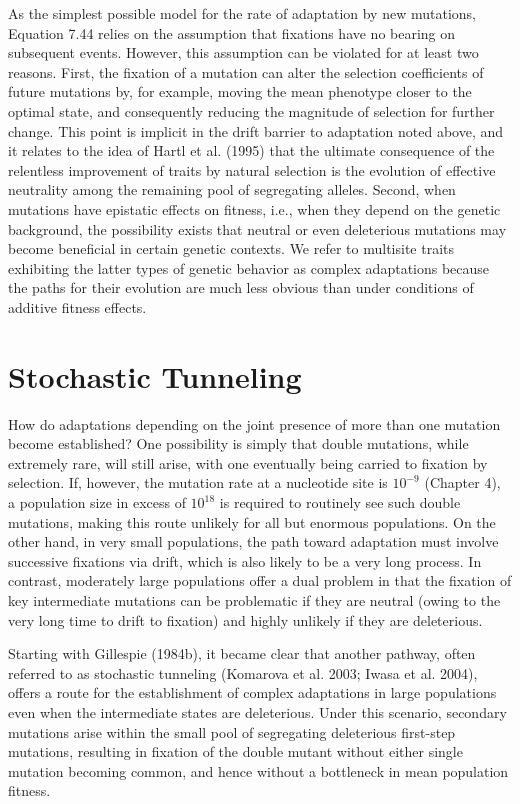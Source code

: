 \documentclass{article}
\begin{document}
As the simplest possible model for the rate of adaptation by new mutations, Equation 7.44 relies on the assumption that fixations have no bearing on subsequent events. However, this assumption can be violated for at least two reasons. First, the fixation of a mutation can alter the selection coefficients of future mutations by, for example, moving the mean phenotype closer to the optimal state, and consequently reducing the magnitude of selection for further change. This point is implicit in the drift barrier to adaptation noted above, and it relates to the idea of Hartl et al. (1995) that the ultimate consequence of the relentless improvement of traits by natural selection is the evolution of effective neutrality among the remaining pool of segregating alleles. Second, when mutations have epistatic effects on fitness, i.e., when they depend on the genetic background, the possibility exists that neutral or even deleterious mutations may become beneficial in certain genetic contexts. We refer to multisite traits exhibiting the latter types of genetic behavior as complex adaptations because the paths for their evolution are much less obvious than under conditions of additive fitness effects.

\section{Stochastic Tunneling}
How do adaptations depending on the joint presence of more than one mutation become established? One possibility is simply that double mutations, while extremely rare, will still arise, with one eventually being carried to fixation by selection. If, however, the mutation rate at a nucleotide site is  $ 10^{-9} $ (Chapter 4), a population size in excess of  $ 10^{18} $ is required to routinely see such double mutations, making this route unlikely for all but enormous populations. On the other hand, in very small populations, the path toward adaptation must involve successive fixations via drift, which is also likely to be a very long process. In contrast, moderately large populations offer a dual problem in that the fixation of key intermediate mutations can be problematic if they are neutral (owing to the very long time to drift to fixation) and highly unlikely if they are deleterious.

Starting with Gillespie (1984b), it became clear that another pathway, often referred to as stochastic tunneling (Komarova et al. 2003; Iwasa et al. 2004), offers a route for the establishment of complex adaptations in large populations even when the intermediate states are deleterious. Under this scenario, secondary mutations arise within the small pool of segregating deleterious first-step mutations, resulting in fixation of the double mutant without either single mutation becoming common, and hence without a bottleneck in mean population fitness.
\end{document}
